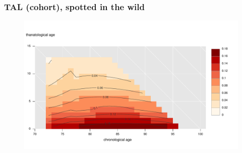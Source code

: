 \documentclass[20pt]{beamer}
\begin{document}
\begin{frame}
\frametitle{TAL (cohort), spotted in the wild}
\begin{figure}[b]
    \centering
    \includegraphics[scale=.9]{Figures/LabPres/ATL_Surf_Male_psych_HRS.pdf}
\end{figure} 
\end{frame}
\end{document}
